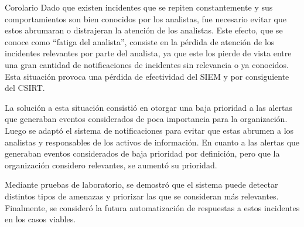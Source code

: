     \begin{section}{Corolario}
    Dado que existen incidentes que se repiten constantemente y sus comportamientos son bien conocidos por los analistas, fue necesario evitar que estos abrumaran o distrajeran la atención de los analistas. Este efecto, que se conoce como “fatiga del analista”, consiste en la pérdida de atención de los incidentes relevantes por parte del analista, ya que este los pierde de vista entre una gran cantidad de notificaciones de incidentes sin relevancia o ya conocidos. Esta situación provoca una pérdida de efectividad del SIEM y por consiguiente del CSIRT.\par
    La solución a esta situación consistió en otorgar una baja prioridad a las alertas que generaban eventos considerados de poca importancia para la organización. Luego se adaptó el sistema de notificaciones para evitar que estas abrumen a los analistas y responsables de los activos de información. 
    En cuanto a las alertas que generaban eventos considerados de baja prioridad por definición, pero que la organización considero relevantes, se aumentó su prioridad. \par
    Mediante pruebas de laboratorio, se demostró que el sistema puede detectar distintos tipos de amenazas y priorizar las que se consideran más relevantes.
    Finalmente, se consideró la futura automatización de respuestas a estos incidentes en los casos viables. \par
    \end{section}
    
